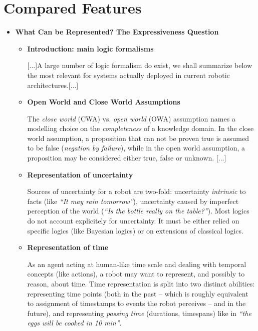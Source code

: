 \documentclass[a4paper]{article}
\begin{document}
\section{Compared Features}

\begin{itemize}
    \item{\bf What Can be Represented? The Expressiveness Question}

    \begin{itemize}
        \item{\bf Introduction: main logic formalisms}

    [...]A large number of logic formalism do exist, we shall summarize below the most
    relevant for systems actually deployed in current robotic architectures.[...]

        \item{\bf Open World and Close World Assumptions}

    The \emph{close world} (CWA) vs. \emph{open world} (OWA) assumption names a
    modelling choice on the \emph{completeness} of a knowledge domain. In the close
    world assumption, a proposition that can not be proven true is assumed to be
    false (\emph{negation by failure}), while in the open world assumption, a
    proposition may be considered either true, false or unknown. [...]

        \item{\bf Representation of uncertainty}
        
	Sources of uncertainty for a robot are two-fold: uncertainty
	\emph{intrinsic} to facts (like \emph{``It may rain tomorrow''}),
	uncertainty caused by imperfect perception of the world (\emph{``Is the
	bottle really on the table?''}). Most logics do not account explicitely for
	uncertainty. It must be either relied on specific logics (like Bayesian
	logics) or on extensions of classical logics.

        \item{\bf Representation of time}

	As an agent acting at human-like time scale and dealing with temporal
	concepts (like actions), a robot may want to represent, and possibly to
	reason, about time. Time representation is split into two distinct
	abilities: representing time points (both in the past -- which is roughly
	equivalent to assignment of timestamps to events the robot perceives -- and
	in the future), and representing \emph{passing time} (durations, timespans)
	like in \emph{``the eggs will be cooked in 10 min''}.
	

\end{itemize}
\end{itemize}
\end{document}
